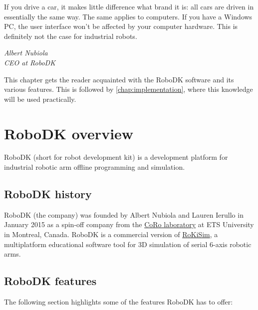 \epigraph{If you drive a car, it makes little difference what brand it is: all cars are driven
in essentially the same way. The same applies to computers. If you have a
Windows PC, the user interface won’t be affected by your computer hardware.
This is definitely not the case for industrial robots.}{\textit{Albert Nubiola \\ CEO at RoboDK}}

This chapter gets the reader acquainted with the RoboDK software and its various features. This is followed by  \autoref{chap:implementation}, where this knowledge will be used practically. 

\section{RoboDK overview}

RoboDK (short for robot development kit) is a development platform for industrial robotic arm offline programming and simulation. 

\subsection{RoboDK history}

RoboDK (the company) was founded by Albert Nubiola and Lauren Ierullo in January 2015 as a spin-off company from the \href{https://en.etsmtl.ca/unites-de-recherche/coro/accueil?lang=en-CA}{CoRo laboratory}   at ETS University in Montreal, Canada. RoboDK is a commercial version of \href{https://www.parallemic.org/RoKiSim.html}{RoKiSim}, a multiplatform educational software tool for 3D simulation of serial 6-axis robotic arms.

\subsection{RoboDK features}


The following section highlights some of the features RoboDK has to offer: 


